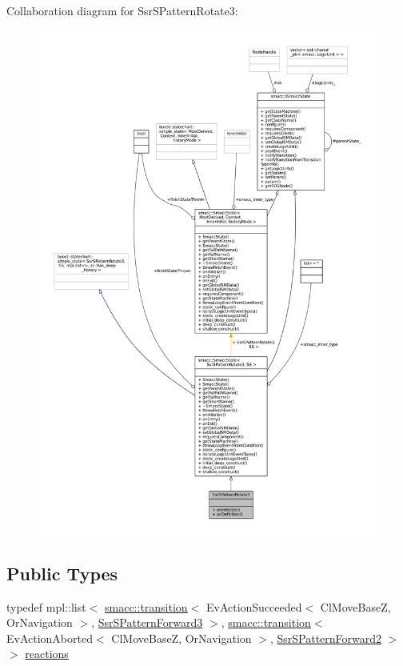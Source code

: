 Collaboration diagram for Ssr\+S\+Pattern\+Rotate3\+:
\nopagebreak
\begin{figure}[H]
\begin{center}
\leavevmode
\includegraphics[width=350pt]{structSsrSPatternRotate3__coll__graph}
\end{center}
\end{figure}
\subsection*{Public Types}
\begin{DoxyCompactItemize}
\item 
typedef mpl\+::list$<$ \hyperlink{classsmacc_1_1transition}{smacc\+::transition}$<$ Ev\+Action\+Succeeded$<$ Cl\+Move\+BaseZ, Or\+Navigation $>$, \hyperlink{structSsrSPatternForward3}{Ssr\+S\+Pattern\+Forward3} $>$, \hyperlink{classsmacc_1_1transition}{smacc\+::transition}$<$ Ev\+Action\+Aborted$<$ Cl\+Move\+BaseZ, Or\+Navigation $>$, \hyperlink{structSsrSPatternForward2}{Ssr\+S\+Pattern\+Forward2} $>$ $>$ \hyperlink{structSsrSPatternRotate3_aa49f94b16a49bb960d50f2a2066c425c}{reactions}
\end{DoxyCompactItemize}
